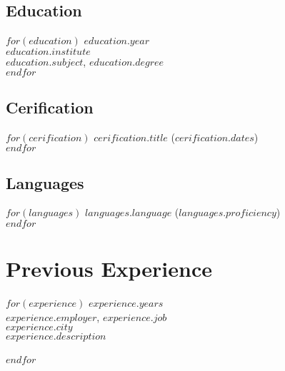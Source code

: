 \documentclass[$fontsize$, a4paper]{article}
\begin{document}
\begin{multicols}{2}

\subsection*{Education}
$for(education)$
\footnotesize{$education.year$}\\
\emph{$education.institute$}\\
\textbf{$education.subject$}, $education.degree$\\
$endfor$

\columnbreak

\subsection*{Cerification}
$for(cerification)$
\href{$cerification.url$}{$cerification.title$} ($cerification.dates$)\\
$endfor$

\vspace{-5pt}

\subsection*{Languages}
$for(languages)$
\emph{$languages.language$} ($languages.proficiency$)\\
$endfor$


\end{multicols}

\vspace{-10pt}



\section*{Previous Experience}
\noindent
$for(experience)$
\footnotesize{$experience.years$}\\
\textsc{$experience.employer$}, \emph{$experience.job$}\\
$experience.city$\\[.2cm]
$experience.description$\\\\
$endfor$
\end{document}
